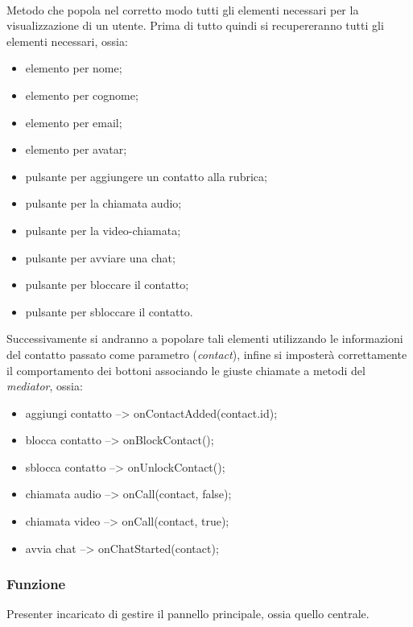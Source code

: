 \begin{description}
\item{}\\
Metodo che popola nel corretto modo tutti gli elementi necessari per la visualizzazione di un utente. Prima di tutto quindi si recupereranno tutti gli elementi necessari, ossia:
\begin{itemize}
\item elemento per nome;
\item elemento per cognome;
\item elemento per email;
\item elemento per avatar;
\item pulsante per aggiungere un contatto alla rubrica;
\item pulsante per la chiamata audio;
\item pulsante per la video-chiamata;
\item pulsante per avviare una chat;
\item pulsante per bloccare il contatto;
\item pulsante per sbloccare il contatto.
\end{itemize}
Successivamente si andranno a popolare tali elementi utilizzando le informazioni del contatto passato come parametro (\textit{contact}), infine si imposterà correttamente il comportamento dei bottoni associando le giuste chiamate a metodi del \textit{mediator}, ossia:
\begin{itemize}
\item aggiungi contatto --> onContactAdded(contact.id);
\item blocca contatto --> onBlockContact();
\item sblocca contatto --> onUnlockContact();
\item chiamata audio --> onCall(contact, false);
\item chiamata video --> onCall(contact, true);
\item avvia chat --> onChatStarted(contact);
\end{itemize}

\end{description}


\subsubsection*{Funzione}
Presenter incaricato di gestire il pannello principale, ossia quello centrale.

